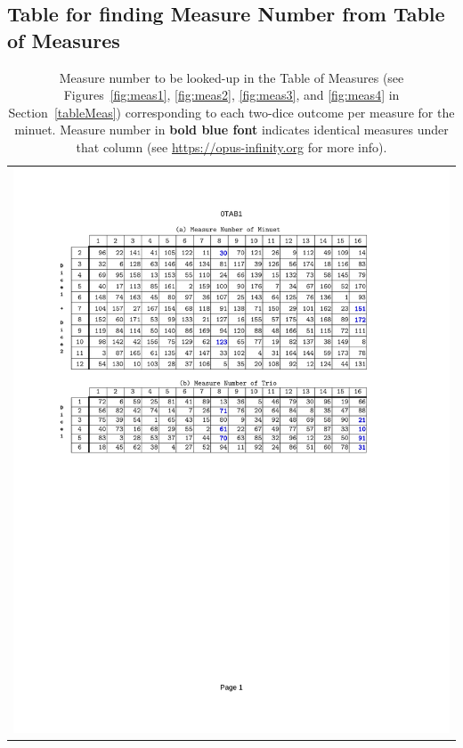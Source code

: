 \documentclass[a4paper,x11names,svgnames,10pt]{article}
\begin{document}
{\subsection{Table for finding Measure Number from Table of Measures}\label{tableFind}

\begin{table}[H]
	\centering
	\begin{tabular}{c}
		\centering
		\includegraphics[clip=true,trim=0.90in 7.00in 1.25in 1.10in,scale=0.90]{gf-TAB}
	\end{tabular}
	\caption{Measure number to be looked-up in the Table of Measures (see Figures~\ref{fig:meas1}, \ref{fig:meas2}, \ref{fig:meas3}, and \ref{fig:meas4} in Section~\ref{tableMeas}) corresponding to each two-dice outcome per measure for the minuet. Measure number in {\bf\color{blue}bold blue font} indicates identical measures under that column (see  \href{https://opus-infinity.org/dice_games/stadler_menuet_trio/tables/}{https://opus-infinity.org} for more info).}
	\label{fig:0tab1}
\end{table}

}
\end{document}
